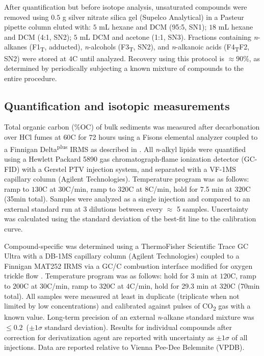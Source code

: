 After quantification but before isotope analysis, unsaturated compounds were removed using $0.5$ g silver nitrate silica gel (Supelco Analytical) in a Pasteur pipette column eluted with: $5$ mL hexane and DCM (95:5, SN1); $18$ mL hexane and DCM (4:1, SN2); $5$ mL DCM and acetone (1:1, SN3). Fractions containing \textit{n}-alkanes (F1\textsubscript{T}, adducted), \textit{n}-alcohols (F3\textsubscript{T}, SN2), and \textit{n}-alkanoic acids (F4\textsubscript{T}F2, SN2) were stored at $4$\textdegree C until analyzed. Recovery using this protocol is $\approx 90$\%, as determined by periodically subjecting a known mixture of compounds to the entire procedure.

\subsection{Quantification and isotopic measurements}

Total organic carbon (\%OC) of bulk sediments was measured after decarbonation over HCl fumes at $60$\textdegree C for 72 hours using a Fisons elemental analyzer coupled to a Finnigan Delta\textsuperscript{plus} IRMS as described in \citet{Whiteside:2011jea}. All \textit{n}-alkyl lipids were quantified using a Hewlett Packard 5890 gas chromatograph-flame ionization detector (GC-FID) with a Gerstel PTV injection system, and separated with a VF-1MS capillary column (Agilent Technologies). Temperature program was as follows: ramp to $130$\textdegree C at $30$\textdegree C/min, ramp to $320$\textdegree C at $8$\textdegree C/min, hold for 7.5 min at $320$\textdegree C (35min total). Samples were analyzed as a single injection and compared to an external standard run at 3 dilutions between every $\approx$ 5 samples. Uncertainty was calculated using the standard deviation of the best-fit line to the calibration curve.

Compound-specific  was determined using a ThermoFisher Scientific Trace GC Ultra with a DB-1MS capillary column (Agilent Technologies) coupled to a Finnigan MAT252 IRMS via a GC/C combustion interface modified for oxygen trickle flow \citep{Merritt:1995vt,Sessions:2006bn}. Temperature program was as follows: hold for 3 min at $120$\textdegree C, ramp to $200$\textdegree C at $30$\textdegree C/min, ramp to $320$\textdegree C at $4$\textdegree C/min, hold for 29.3 min at $320$\textdegree C (70min total). All samples were measured at least in duplicate (triplicate when not limited by low concentrations) and calibrated against pulses of CO\textsubscript{2} gas with a known  value. Long-term precision of an external \textit{n}-alkane standard mixture was $\leq 0.2$\textperthousand\ ($\pm 1\sigma$ standard deviation). Results for individual compounds after correction for derivatization agent are reported with uncertainty as $\pm 1\sigma$ of all injections. Data are reported relative to Vienna Pee-Dee Belemnite (VPDB).


